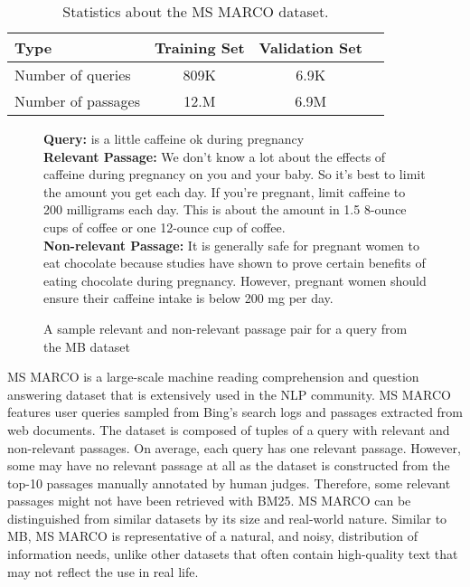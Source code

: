 \begin{table}[b]
\vspace{0.2cm}
\centering
\begin{tabular}{lccc}
\toprule
\textbf{Type} \mbox{\hspace{0.5cm}} & \textbf{Training Set} \mbox{\hspace{1.0cm}} & \textbf{Validation Set} \mbox{\hspace{1.0cm}} \\
\toprule
Number of queries & 809K & 6.9K \\
Number  of passages & 12.M & 6.9M \\
\bottomrule
\end{tabular}
\vspace{0.2cm}
\caption{Statistics about the MS MARCO dataset.}
\label{tab:marco-stats}
\end{table}

\begin{figure}[b!]
	\begin{framed}
    		\textbf{Query:} is a little caffeine ok during pregnancy \\
    		\textbf{Relevant Passage:} We don't know a lot about the effects of caffeine during pregnancy on you and your baby. So it's best to limit the amount you get each day. If you're pregnant, limit caffeine to 200 milligrams each day. This is about the amount in 1.5 8-ounce cups of coffee or one 12-ounce cup of coffee. \\
    		\textbf{Non-relevant Passage:} It is generally safe for pregnant women to eat chocolate because studies have shown to prove certain benefits of eating chocolate during pregnancy. However, pregnant women should ensure their caffeine intake is below 200 mg per day. \\
	\end{framed}
\label{marco-example}
 \caption{A sample relevant and non-relevant passage pair for a query from the MB dataset}
\end{figure}

MS MARCO is a large-scale machine reading comprehension and question answering dataset that is extensively used in the NLP community.
MS MARCO~\cite{nguyen2016msmarco} features user queries sampled from Bing’s search logs and passages extracted from web documents.
The dataset is composed of tuples of a query with relevant and non-relevant passages.
On average, each query has one relevant passage.
However, some may have no relevant passage at all as the dataset is constructed from the top-10 passages manually annotated by human judges.
Therefore, some relevant passages might not have been retrieved with BM25.
MS MARCO can be distinguished from similar datasets by its size and real-world nature.
Similar to MB, MS MARCO is representative of a natural, and noisy, distribution of information needs, unlike other datasets that often contain high-quality text that may not reflect the use in real life.

